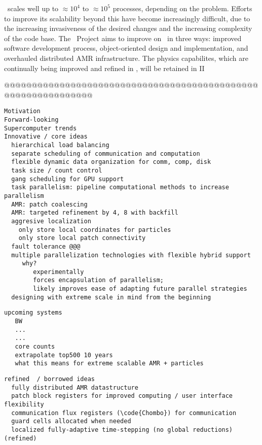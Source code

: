 \documentclass[14pt,letter]{article}
\begin{document}
\enzo\ scales well up to $\approx 10^4$ to $\approx 10^5$ processes,
depending on the problem.  Efforts to improve its scalability beyond
this have become increasingly difficult, due to the increasing
invasiveness of the desired changes and the increasing complexity of
the code base.  The \cello\ Project aims to improve on \enzo\ in three
ways: improved software development process, object-oriented design
and implementation, and overhauled distributed AMR infrastructure.  The
physics capabilites, which are continually being improved and refined in \enzo, will be retained in \enzo II



@@@@@@@@@@@@@@@@@@@@@@@@@@@@@@@@@@@@@@@@@@@@@@@@@@@@@@@@@@@@@@ \ \\

\begin{verbatim}
Motivation
Forward-looking
Supercomputer trends
Innovative / core ideas
  hierarchical load balancing
  separate scheduling of communication and computation
  flexible dynamic data organization for comm, comp, disk
  task size / count control
  gang scheduling for GPU support
  task parallelism: pipeline computational methods to increase parallelism
  AMR: patch coalescing
  AMR: targeted refinement by 4, 8 with backfill
  aggresive localization
    only store local coordinates for particles
    only store local patch connectivity
  fault tolerance @@@
  multiple parallelization technologies with flexible hybrid support
     why?  
        experimentally 
        forces encapsulation of parallelism; 
        likely improves ease of adapting future parallel strategies
  designing with extreme scale in mind from the beginning
\end{verbatim}

\begin{verbatim}
upcoming systems
   BW
   ...
   ...
   core counts
   extrapolate top500 10 years
   what this means for extreme scalable AMR + particles
\end{verbatim}

\begin{verbatim}
refined  / borrowed ideas
  fully distributed AMR datastructure
  patch block registers for improved computing / user interface flexibility
  communication flux registers (\code{Chombo}) for communication
  guard cells allocated when needed
  localized fully-adaptive time-stepping (no global reductions) (refined)
\end{verbatim}


\end{document}
